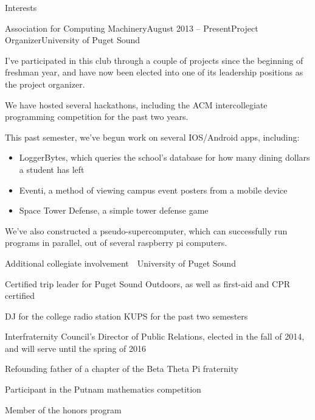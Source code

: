 \documentclass{resume} %
\begin{document}
\begin{rSection}{Interests}

\begin{rSubsection}{Association for Computing Machinery}{August 2013 -- Present}{Project Organizer}{University of Puget Sound}

\item I've participated in this club through a couple of projects since the beginning of freshman year, and have now been elected into one of its leadership positions as the project organizer. 
\item We have hosted several hackathons, including the ACM intercollegiate programming competition for the past two years. 
\item This past semester, we've begun work on several IOS/Android apps, including:
  \begin{itemize}
    \item LoggerBytes, which queries the school's database for how many dining dollars a student has left 
    \item Eventi, a method of viewing campus event posters from a mobile device
    \item Space Tower Defense, a simple tower defense game
  \end{itemize}
\item We've also constructed a pseudo-supercomputer, which can successfully run programs in parallel, out of several raspberry pi computers. 
\end{rSubsection}
\begin{rSubsection}{Additional collegiate involvement}{\ }{\ }{University of Puget Sound}
\item Certified trip leader for Puget Sound Outdoors, as well as first-aid and CPR certified
\item DJ for the college radio station KUPS for the past two semesters
\item Interfraternity Council's Director of Public Relations, elected in the fall of 2014, and will serve until the spring of 2016
\item Refounding father of a chapter of the Beta Theta Pi fraternity
\item Participant in the Putnam mathematics competition
\item Member of the honors program
\end{rSubsection}



\end{rSection}
\end{document}
